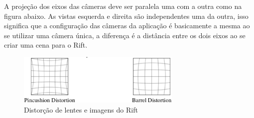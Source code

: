 A projeção dos eixos das câmeras deve ser paralela uma com a outra como na figura abaixo. As vistas esquerda e direita são independentes uma da outra, isso significa que a configuração das câmeras da aplicação é basicamente a mesma ao se utilizar uma câmera única, a diferença é a distância entre os dois eixos ao se criar uma cena para o Rift.

\begin{figure}[h]
  \centering
  \includegraphics[width=0.7\textwidth]
      {figuras/distorcao_rift.eps}
  \caption{Distorção de lentes e imagens do Rift}
  \label{coordenadas-rift}
\end{figure}